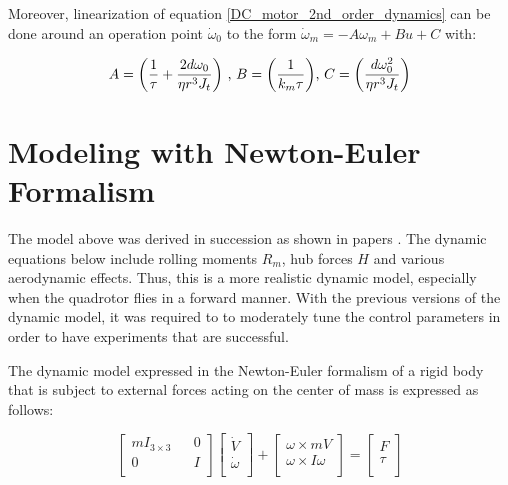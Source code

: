\documentclass{thesisreport}
\begin{document}
Moreover, linearization of equation \ref{DC_motor_2nd_order_dynamics} can be done around an operation point $\dot{\omega}_0$ to the form $\dot{\omega}_m = -A \omega_m + B u + C$ with: 

\begin{equation}
A = \bigg( \frac{1}{\tau}+\frac{2d\omega_0}{\eta r^3 J_t} \bigg) \text{ \hfill , \hfill} B = \bigg( \frac{1}{k_m \tau} \bigg) \text{\hfill , \hfill} C = \bigg( \frac{d \omega_0^2}{\eta r^3 J_t} \bigg)
\end{equation}
 
 
 \section{Modeling with Newton-Euler Formalism}
 
The model above was derived in succession as shown in papers  \cite{Bouabdallah2004,Bouabdallah2005a,Bouabdallah2005b} . The dynamic equations below include rolling moments $R_m$, hub forces $H$ and various aerodynamic effects.
Thus, this is a more realistic dynamic model, especially when the quadrotor flies in a forward manner. 
With the previous versions of the dynamic model, it was required to to moderately tune the control parameters in order to have experiments that are successful.

The dynamic model expressed in the Newton-Euler formalism of a rigid body that is subject to external forces acting on the center of mass  \cite{Murray1994} is expressed as follows:

\begin{equation}\label{NE_Formalism}
\begin{bmatrix}
m I_{3 \times 3} && 0 \\
0 && I \\
\end{bmatrix}
\begin{bmatrix}
\dot{V}\\
\dot{\omega}\\
\end{bmatrix}
+ \begin{bmatrix}
\omega \times mV \\
\omega \times I \omega \\
\end{bmatrix}
=
\begin{bmatrix}
F \\
\tau \\
\end{bmatrix}
\end{equation}
 
\end{document}
